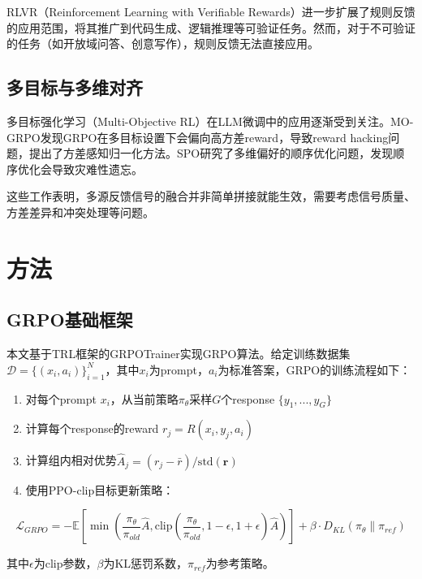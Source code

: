 \documentclass[10.5pt]{article}
\begin{document}
RLVR（Reinforcement Learning with Verifiable Rewards）\cite{rlvr}进一步扩展了规则反馈的应用范围，将其推广到代码生成、逻辑推理等可验证任务。然而，对于不可验证的任务（如开放域问答、创意写作），规则反馈无法直接应用。

\subsection{多目标与多维对齐}

多目标强化学习（Multi-Objective RL）在LLM微调中的应用逐渐受到关注。MO-GRPO\cite{mogrpo}发现GRPO在多目标设置下会偏向高方差reward，导致reward hacking问题，提出了方差感知归一化方法。SPO\cite{spo}研究了多维偏好的顺序优化问题，发现顺序优化会导致灾难性遗忘。

这些工作表明，多源反馈信号的融合并非简单拼接就能生效，需要考虑信号质量、方差差异和冲突处理等问题。

\section{方法}

\subsection{GRPO基础框架}

本文基于TRL框架\cite{trl}的GRPOTrainer实现GRPO算法。给定训练数据集$\mathcal{D} = \{(x_i, a_i)\}_{i=1}^{N}$，其中$x_i$为prompt，$a_i$为标准答案，GRPO的训练流程如下：

\begin{enumerate}[leftmargin=2em]
  \item 对每个prompt $x_i$，从当前策略$\pi_\theta$采样$G$个response $\{y_1, ..., y_G\}$
  \item 计算每个response的reward $r_j = R(x_i, y_j, a_i)$
  \item 计算组内相对优势$\hat{A}_j = (r_j - \bar{r}) / \text{std}(\mathbf{r})$
  \item 使用PPO-clip目标更新策略：
\end{enumerate}

\begin{equation}
\mathcal{L}_{GRPO} = -\mathbb{E}\left[\min\left(\frac{\pi_\theta}{\pi_{old}} \hat{A}, \text{clip}\left(\frac{\pi_\theta}{\pi_{old}}, 1-\epsilon, 1+\epsilon\right) \hat{A}\right)\right] + \beta \cdot D_{KL}(\pi_\theta \| \pi_{ref})
\end{equation}

其中$\epsilon$为clip参数，$\beta$为KL惩罚系数，$\pi_{ref}$为参考策略。
\end{document}

